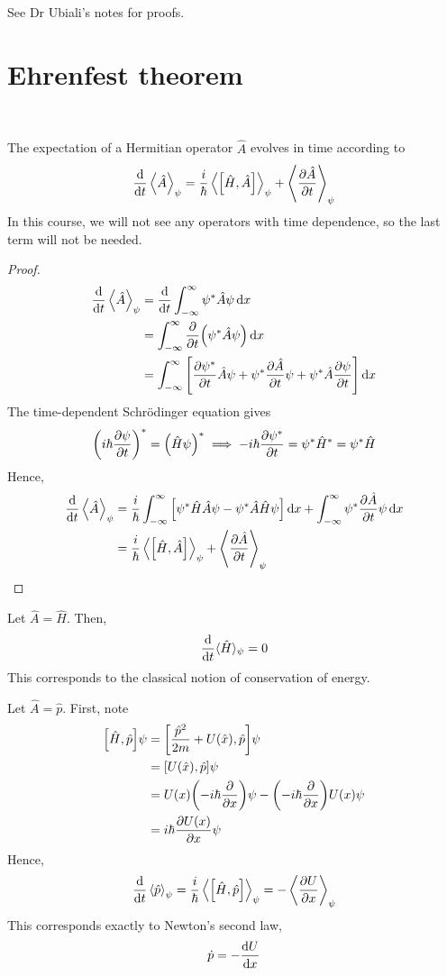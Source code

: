 \documentclass[a4paper]{article}
\begin{document}
See Dr Ubiali's notes for proofs.

\section{Ehrenfest theorem}\ \vspace{-1.5em}
\begin{theorem}
	The expectation of a Hermitian operator $ \hat{A} $ evolves in time according to
	\[
		\dv{t} \left\langle{\hat A}\right\rangle_\psi = \frac{i}{\hbar} \left\langle{\qty[\hat H, \hat A]}\right\rangle_\psi + \left\langle{\pdv{\hat A}{t}}\right\rangle_\psi
	\]
	In this course, we will not see any operators with time dependence, so the last term will not be needed.
\end{theorem}
\begin{proof}
	\begin{align*}
		\dv{t} \left\langle{\hat A}\right\rangle_\psi & = \dv{t} \int_{-\infty}^\infty \psi^* \hat A \psi \dd{x}                                                                              \\
		                           & = \int_{-\infty}^\infty \pdv{t} \qty(\psi^* \hat A \psi) \dd{x}                                                                       \\
		                           & = \int_{-\infty}^\infty \qty[\pdv{\psi^*}{t} \hat A \psi + \psi^* \pdv{\hat A}{t} \psi + \psi^* \hat A \pdv{\psi}{t} ] \dd{x}
	\end{align*}
	The time-dependent Schr\"odinger equation gives
	\[
		\qty(i \hbar \pdv{\psi}{t})^* = \qty(\hat H \psi)^* \implies -i\hbar \pdv{\psi^*}{t} = \psi^* \hat H^* = \psi^* \hat H
	\]
	Hence,
	\begin{align*}
		\dv{t} \left\langle{\hat A}\right\rangle_\psi & = \frac{i}{\hbar} \int_{-\infty}^\infty \qty[\psi^* \hat H \hat A \psi - \psi^* \hat A \hat H \psi] \dd{x} + \int_{-\infty}^\infty \psi^* \pdv{\hat A}{t} \psi \dd{x} \\
		                           & = \frac{i}{\hbar} \left\langle{\qty[\hat H, \hat A]}\right\rangle_\psi + \left\langle{\pdv{\hat A}{t}}\right\rangle_\psi \qedhere
	\end{align*}
\end{proof}
\begin{example}
	Let \( \hat A = \hat H \).
	Then,
	\[
		\dv{t} \langle{\hat H}\rangle_\psi = 0
	\]
	This corresponds to the classical notion of conservation of energy.
\end{example}
\begin{example}
	Let \( \hat A = \hat p \).
	First, note
	\begin{align*}
		\qty[\hat H, \hat p] \psi & = \qty[\frac{\hat p^2}{2m} + U(\hat x), \hat p] \psi               \\
		                          & = \qty[U(\hat x), \hat p] \psi                                     \\
		                          & = U(x) \qty(-i\hbar \pdv{x}) \psi - \qty(-i\hbar \pdv{x})U(x) \psi \\
		                          & = i \hbar \pdv{U(x)}{x} \psi
	\end{align*}
	Hence,
	\[
		\dv{t}\left\langle{\hat p}\right\rangle_\psi = \frac{i}{\hbar} \left\langle{\qty[\hat H, \hat p]}\right\rangle_\psi = -\left\langle{\pdv{U}{x}}\right\rangle_\psi
	\]
	This corresponds exactly to Newton's second law,
	\[
		\dot p = -\dv{U}{x}
	\]
\end{example}
\end{document}

